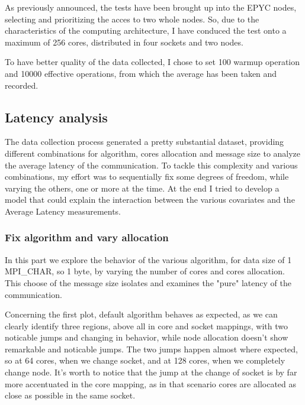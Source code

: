 \documentclass{article}
\begin{document}
	As previously announced, the tests have been brought up into the EPYC nodes, selecting and prioritizing the acces to two whole nodes. So, due to the characteristics of the computing architecture, I have conduced the test onto a maximum of 256 cores, distributed in four sockets and two nodes.
	
	To have better quality of the data collected, I chose to set 100 warmup operation and 10000 effective operations, from which the average has been taken and recorded.
	
	\subsection{Latency analysis}
	
	The data collection process generated a pretty substantial dataset, providing different combinations for algorithm, cores allocation and message size to analyze the average latency of the communication.
	To tackle this complexity and various combinations, my effort was to sequentially fix some degrees of freedom, while varying the others, one or more at the time. At the end I tried to develop a model that could explain the interaction between the various covariates and the Average Latency measurements.
	
	\subsubsection{Fix algorithm and vary allocation}
	
	In this part we explore the behavior of the various algorithm, for data size of 1 MPI\_CHAR, so 1 byte, by varying the number of cores and cores allocation. This choose of the message size isolates and examines the "pure" latency of the communication.
	
	
	Concerning the first plot, default algorithm behaves as expected, as we can clearly identify three regions, above all in core and socket mappings, with two noticable jumps and changing in behavior, while node allocation doesn't show remarkable and noticable jumps. The two jumps happen almost where expected, so at 64 cores, when we change socket, and at 128 cores, when we completely change node. It's worth to notice that the jump at the change of socket is by far more accentuated in the core mapping, as in that scenario cores are allocated as close as possible in the same socket. 
	
\end{document}
